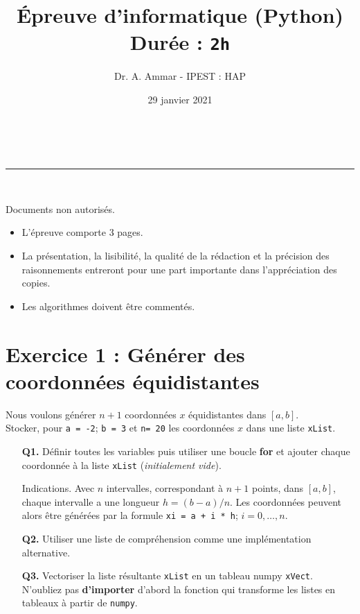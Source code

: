 \documentclass[a4paper,11pt]{article}
\author{Dr. A. Ammar - IPEST : HAP}
\date{29 janvier 2021}
\makeatletter
\newcommand{\linia}{\rule{\linewidth}{0.5pt}}
\theoremstyle{mytheor}
\renewcommand{\maketitle}{
\begin{center}
\vspace{2ex}
{\huge \textsc{\@title}}
\vspace{1ex}
\\
\linia\\
\@author \hfill \@date
\vspace{4ex}
\end{center}
}
\makeatother
\begin{document}
	
\title{Épreuve d'informatique (Python)  \\ Durée : \texttt{2h}}

\maketitle
\begin{bclogo}[logo=\bcattention, couleurBarre=red, noborder=true, couleur=red!10]{Documents non autorisés.}
\begin{itemize}
\item L'épreuve comporte 3 pages.
\item La présentation, la lisibilité, la qualité de la rédaction et la précision des raisonnements entreront pour une part importante dans l'appréciation des copies.
\item  Les algorithmes doivent être commentés.
\end{itemize}

\end{bclogo}
\section*{Exercice 1 : Générer des coordonnées équidistantes}
Nous voulons générer $n + 1$ coordonnées $x$ équidistantes dans $[a, b]$.\\
Stocker, pour \texttt{a = -2}; \texttt{b = 3} et \texttt{n= 20} les coordonnées $x$ dans une liste \texttt{xList}.


\begin{itemize}
\item[\textbf{Q1.}] Définir toutes les variables puis utiliser une boucle \textbf{for} et ajouter chaque coordonnée à la liste \texttt{xList} (\emph{initialement vide}).

\begin{bclogo}[logo=\bclampe, couleurBarre=green, noborder=true, couleur=yellow!10]{Indications.}
Avec $n$ intervalles, correspondant à $n + 1$ points, dans $[a, b]$, chaque intervalle a une longueur $h = (b-a) / n$. Les coordonnées peuvent alors être générées par la formule \texttt{xi = a + i * h}; $i = 0,…, n$.

\end{bclogo}

\item[\textbf{Q2.}] Utiliser une liste de compréhension comme une implémentation alternative.


\item[\textbf{Q3.}] Vectoriser la liste résultante \texttt{xList} en un tableau numpy \verb|xVect|. \\
N'oubliez pas \textbf{d'importer} d'abord la fonction qui transforme les listes en tableaux à partir de \texttt{numpy}.
\end{itemize}
\end{document}

